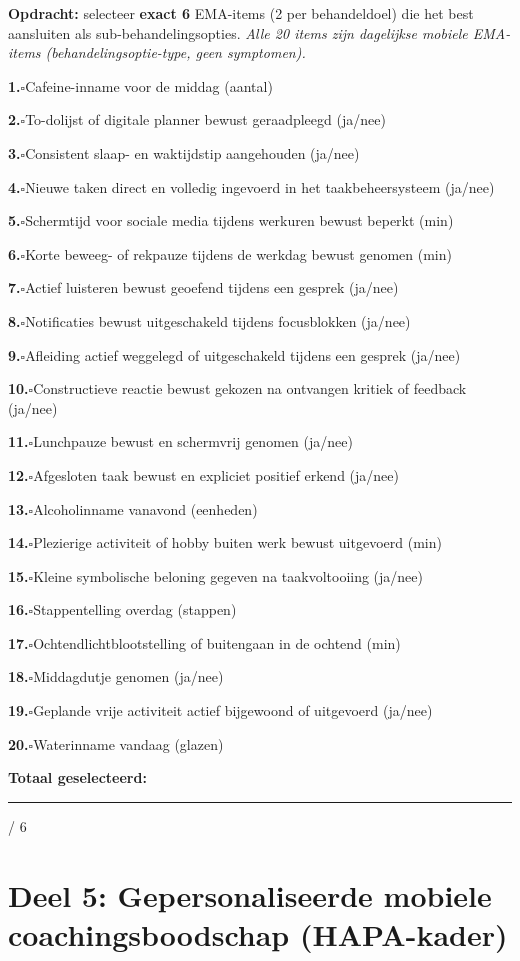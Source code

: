 \documentclass[11pt,a4paper]{article}
\newcommand{\checkitemBFS}[2]{%
\noindent\small\textbf{#1.}\hspace{0.45em}$\square$\hspace{0.4em}#2\par\vspace{0.20em}}
\begin{document}
\begin{responsebox}
\small\textbf{Opdracht:} selecteer \textbf{exact 6} EMA-items (2 per behandeldoel) die het best aansluiten als sub-behandelingsopties.
\textit{Alle 20 items zijn dagelijkse mobiele EMA-items (behandelingsoptie-type, geen symptomen).}

\checkitemBFS{1}{Cafeine-inname voor de middag (aantal)}
\checkitemBFS{2}{To-dolijst of digitale planner bewust geraadpleegd (ja/nee)}
\checkitemBFS{3}{Consistent slaap- en waktijdstip aangehouden (ja/nee)}
\checkitemBFS{4}{Nieuwe taken direct en volledig ingevoerd in het taakbeheersysteem (ja/nee)}
\checkitemBFS{5}{Schermtijd voor sociale media tijdens werkuren bewust beperkt (min)}
\checkitemBFS{6}{Korte beweeg- of rekpauze tijdens de werkdag bewust genomen (min)}
\checkitemBFS{7}{Actief luisteren bewust geoefend tijdens een gesprek (ja/nee)}
\checkitemBFS{8}{Notificaties bewust uitgeschakeld tijdens focusblokken (ja/nee)}
\checkitemBFS{9}{Afleiding actief weggelegd of uitgeschakeld tijdens een gesprek (ja/nee)}
\checkitemBFS{10}{Constructieve reactie bewust gekozen na ontvangen kritiek of feedback (ja/nee)}
\checkitemBFS{11}{Lunchpauze bewust en schermvrij genomen (ja/nee)}
\checkitemBFS{12}{Afgesloten taak bewust en expliciet positief erkend (ja/nee)}
\checkitemBFS{13}{Alcoholinname vanavond (eenheden)}
\checkitemBFS{14}{Plezierige activiteit of hobby buiten werk bewust uitgevoerd (min)}
\checkitemBFS{15}{Kleine symbolische beloning gegeven na taakvoltooiing (ja/nee)}
\checkitemBFS{16}{Stappentelling overdag (stappen)}
\checkitemBFS{17}{Ochtendlichtblootstelling of buitengaan in de ochtend (min)}
\checkitemBFS{18}{Middagdutje genomen (ja/nee)}
\checkitemBFS{19}{Geplande vrije activiteit actief bijgewoond of uitgevoerd (ja/nee)}
\checkitemBFS{20}{Waterinname vandaag (glazen)}
\vspace{0.4em}
\noindent\textbf{Totaal geselecteerd:}\hspace{0.5em}\rule{1.2cm}{0.25pt}\hspace{0.2em}/ 6
\end{responsebox}

\vspace{0.6em}
\newpage


\section{Deel 5: Gepersonaliseerde mobiele coachingsboodschap (HAPA-kader)}
\end{document}
